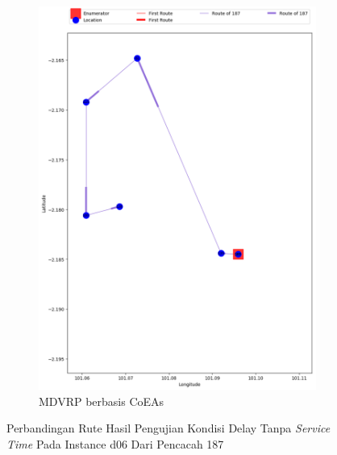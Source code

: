 \begin{figure}[H]
	\centering
	\begin{subfigure}[t]{\textwidth}
		\centering
		\includegraphics[width=\textwidth]{Resources/Images/delayed_6/real_m15_n100_delayed_6_187_coes}
		\caption{MDVRP berbasis CoEAs}
		\label{fig:real_m15_n100_delayed_6_187_coes}
	\end{subfigure}
	\caption{Perbandingan Rute Hasil Pengujian Kondisi Delay Tanpa \textit{Service Time} Pada Instance d06 Dari Pencacah 187}
	\label{fig:real_m15_n100_delayed_6_187}
\end{figure}


